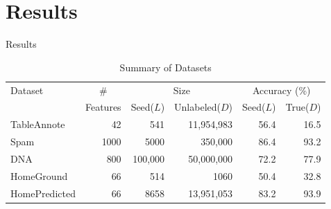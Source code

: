 \documentclass[11pt]{beamer}
\begin{document}
\section{Results}
\begin{frame}[allowframebreaks]{Results}
\begin{center}
\begin{table}
\centering
\begin{small}
\begin{tabular}{|l@{}|@{}r|@{}r|@{}r|@{}r|@{}r|}
\hline
Dataset & \multicolumn{1}{c}{\#} \vline & \multicolumn{2}{c}{Size} \vline & \multicolumn{2}{c}{Accuracy (\%)} \vline \\
 & \multicolumn{1}{c}{Features} \vline & \multicolumn{1}{c}{Seed($L$)} \vline & \multicolumn{1}{c}{Unlabeled($D$)} \vline & \multicolumn{1}{r}{Seed($L$)} \vline & \multicolumn{1}{r}{True($D$)} \vline \\
\hline
TableAnnote & 42 & 541 & 11,954,983 & 56.4 & 16.5 \\
Spam & 1000 & 5000 & 350,000 & 86.4 & 93.2 \\
DNA & 800 & 100,000 & 50,000,000 & 72.2 & 77.9 \\
HomeGround & 66 & 514 & 1060 & 50.4 & 32.8 \\
HomePredicted & 66 & 8658 & 13,951,053 & 83.2 & 93.9 \\
\hline
\end{tabular}
\end{small}
\caption{Summary of Datasets}
\end{table}
\end{center}

\framebreak


\end{frame}
\end{document}
